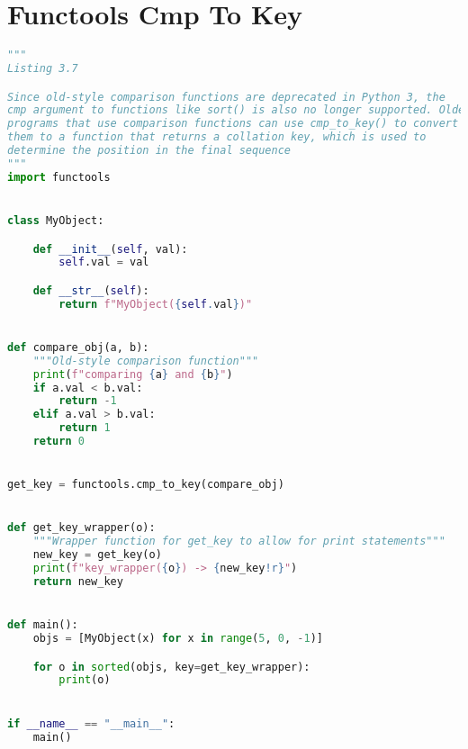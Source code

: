 \documentclass[a4paper,landscape]{report}
\begin{document}
\section{Functools Cmp To Key}
\begin{lstlisting}[language=Python]
"""
Listing 3.7

Since old-style comparison functions are deprecated in Python 3, the
cmp argument to functions like sort() is also no longer supported. Older
programs that use comparison functions can use cmp_to_key() to convert
them to a function that returns a collation key, which is used to
determine the position in the final sequence
"""
import functools


class MyObject:

    def __init__(self, val):
        self.val = val

    def __str__(self):
        return f"MyObject({self.val})"


def compare_obj(a, b):
    """Old-style comparison function"""
    print(f"comparing {a} and {b}")
    if a.val < b.val:
        return -1
    elif a.val > b.val:
        return 1
    return 0


get_key = functools.cmp_to_key(compare_obj)


def get_key_wrapper(o):
    """Wrapper function for get_key to allow for print statements"""
    new_key = get_key(o)
    print(f"key_wrapper({o}) -> {new_key!r}")
    return new_key


def main():
    objs = [MyObject(x) for x in range(5, 0, -1)]

    for o in sorted(objs, key=get_key_wrapper):
        print(o)


if __name__ == "__main__":
    main()

\end{lstlisting}
\end{document}
